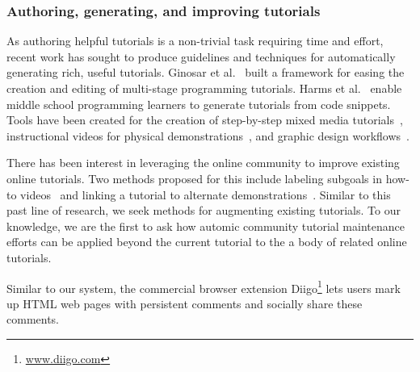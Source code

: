 \subsubsection{Authoring, generating, and improving tutorials}

As authoring helpful tutorials is a non-trivial task requiring time and effort, recent work has sought to produce guidelines and techniques for automatically generating rich, useful tutorials.
Ginosar et al.~\cite{ginosar_authoring_2013} built a framework for easing the creation and editing of multi-stage programming tutorials.
Harms et al.~\cite{harms_automatically_2013} enable middle school programming learners to generate tutorials from code snippets.
Tools have been created for the creation of step-by-step mixed media tutorials~\cite{chi_mixt_2012}, instructional videos for physical demonstrations~\cite{chi_democut_2013}, and graphic design workflows~\cite{grossman_chronicle_2010}.

There has been interest in leveraging the online community to improve existing online tutorials.
Two methods proposed for this include labeling subgoals in how-to videos~\cite{kim_learnersourcing_2013} and linking a tutorial to alternate demonstrations~\cite{lafreniere_community_2013}.
Similar to this past line of research, we seek methods for augmenting existing tutorials.
To our knowledge, we are the first to ask how automic community tutorial maintenance efforts can be applied beyond the current tutorial to the a body of related online tutorials.

Similar to our system, the commercial browser extension Diigo\footnote{\url{www.diigo.com}} lets users mark up HTML web pages with persistent comments and socially share these comments.

